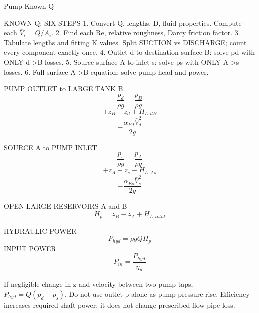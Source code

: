 Pump Known Q

KNOWN Q: SIX STEPS
1. Convert Q, lengths, D, fluid properties. Compute each $\bar V_i=Q/A_i$.
2. Find each Re, relative roughness, Darcy friction factor.
3. Tabulate lengths and fitting K values. Split SUCTION vs DISCHARGE; count every component exactly once.
4. Outlet d to destination surface B: solve pd with ONLY d->B losses.
5. Source surface A to inlet s: solve ps with ONLY A->s losses.
6. Full surface A->B equation: solve pump head and power.

PUMP OUTLET to LARGE TANK B
$$\frac{p_d}{\rho g}=\frac{p_B}{\rho g}$$
$$+z_B-z_d+H_{L,dB}$$
$$-\frac{\alpha_{Ed}\bar V_d^2}{2g}$$

SOURCE A to PUMP INLET
$$\frac{p_s}{\rho g}=\frac{p_A}{\rho g}$$
$$+z_A-z_s-H_{L,As}$$
$$-\frac{\alpha_{Es}\bar V_s^2}{2g}$$

OPEN LARGE RESERVOIRS A and B
$$H_p=z_B-z_A+H_{L,total}$$

HYDRAULIC POWER
$$P_{hyd}=\rho gQH_p$$
INPUT POWER
$$P_{in}=\frac{P_{hyd}}{\eta_p}$$

If negligible change in z and velocity between two pump taps, $P_{hyd}=Q(p_d-p_s)$.
Do not use outlet p alone as pump pressure rise. Efficiency increases required shaft power; it does not change prescribed-flow pipe loss.
